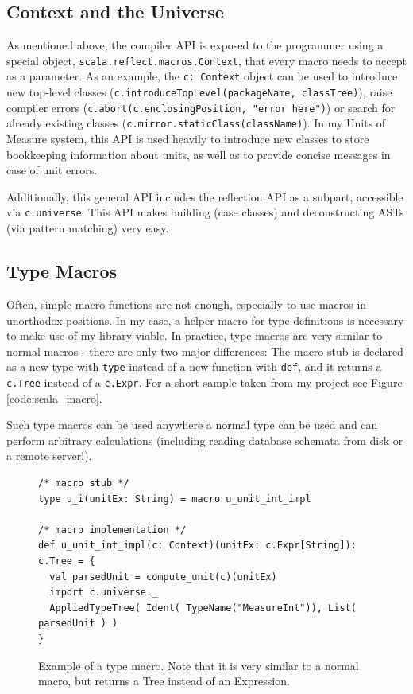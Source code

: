 \documentclass[12pt,oneside,a4paper]{scrbook}
\begin{document}
\subsection{Context and the Universe}

As mentioned above, the compiler API is exposed to the programmer using a special object, \verb|scala.reflect.macros.Context|, that every macro needs to accept as a parameter. As an example, the \verb|c: Context| object can be used to introduce new top-level classes (\verb|c.introduceTopLevel(packageName, classTree)|), raise compiler errors (\verb|c.abort(c.enclosingPosition, "error here")|) or search for already existing classes (\verb|c.mirror.staticClass(className)|). In my Units of Measure system, this API is used heavily to introduce new classes to store bookkeeping information about units, as well as to provide concise messages in case of unit errors.

Additionally, this general API includes the reflection API as a subpart, accessible via \verb|c.universe|. This API makes building (case classes) and deconstructing ASTs (via pattern matching) very easy.


\subsection{Type Macros}
Often, simple macro functions are not enough, especially to use macros in unorthodox positions. In my case, a helper macro for type definitions is necessary to make use of my library viable. In practice, type macros are very similar to normal macros - there are only two major differences: The macro stub is declared as a new type with \verb|type| instead of a new function with \verb|def|, and it returns a \verb|c.Tree| instead of a \verb|c.Expr|. For a short sample taken from my project see Figure \ref{code:scala_macro}.

Such type macros can be used anywhere a normal type can be used and can perform arbitrary calculations (including reading database schemata from disk or a remote server!).

\begin{figure}
\begin{verbatim}
/* macro stub */
type u_i(unitEx: String) = macro u_unit_int_impl

/* macro implementation */
def u_unit_int_impl(c: Context)(unitEx: c.Expr[String]): c.Tree = {
  val parsedUnit = compute_unit(c)(unitEx)
  import c.universe._
  AppliedTypeTree( Ident( TypeName("MeasureInt")), List( parsedUnit ) )
}
\end{verbatim}
\caption{Example of a type macro. Note that it is very similar to a normal macro, but returns a Tree instead of an Expression.}
\label{code:scala_typemacro}
\end{figure}
\end{document}
